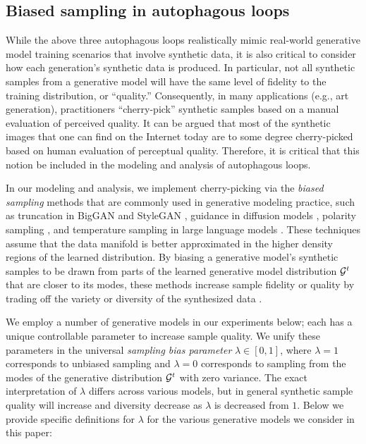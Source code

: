 \documentclass{article}
\def\bias{{\lambda}}
\begin{document}
\subsection{Biased sampling in autophagous loops}
\label{sec:sampling}

While the above three autophagous loops realistically mimic real-world generative model training scenarios that involve synthetic data, it is also critical to consider how each generation's synthetic data is produced.
In particular, not all synthetic samples from a generative model will have the same level of fidelity to the training distribution, or ``quality.'' Consequently, in many applications (e.g., art generation), practitioners ``cherry-pick'' synthetic samples based on a manual evaluation of perceived quality.
It can be argued that most of the synthetic images that one can find on the Internet today are to some degree cherry-picked based on human evaluation of perceptual quality. 
Therefore, it is critical that this notion be included in the modeling and analysis of autophagous loops. 


In our modeling and analysis, we implement cherry-picking via the {\em biased sampling} methods that are commonly used in generative modeling practice, such as truncation in BigGAN and StyleGAN \cite{biggan, Karras2019stylegan2}, guidance in diffusion models \cite{classifier_free_guidance}, polarity sampling \cite{Humayun_2022_CVPR}, and temperature sampling in large language models \cite{gpt4}. 
These techniques assume that the data manifold is better approximated in the higher density regions of the learned distribution. 
By biasing a generative model's synthetic samples to be drawn from parts of the learned generative model distribution $\mathcal{G}^t$ that are closer to its modes, these methods increase sample fidelity or quality by trading off the variety or diversity of the synthesized data \cite{Humayun_2022_CVPR}.

We employ a number of generative models in our experiments below; each has a unique controllable parameter to 
increase sample quality. We unify these parameters in the universal {\em sampling bias parameter} $\bias \in [0, 1]$, where $\bias = 1$ corresponds to unbiased sampling and $\bias = 0$ corresponds to sampling from the modes of the generative distribution $\mathcal{G}^t$ with zero variance. The exact interpretation of $\bias$ differs across various models, but in general synthetic sample quality will increase and diversity decrease as $\bias$ is decreased from $1$. 
Below we provide specific definitions for $\bias$ for the various generative models we consider in this paper:
\end{document}
